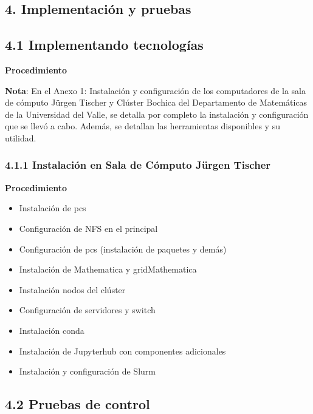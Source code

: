 \begin{spacing}{1.5}
  \begin{tightcenter}
    \section{4. Implementación y pruebas}
    \mylinespacing
  \end{tightcenter}

  \subsection{4.1 Implementando tecnologías}

  \textbf{Procedimiento}

  \textbf{Nota}: En el Anexo 1: Instalación y configuración de los computadores de la sala de cómputo Jürgen Tischer y Clúster Bochica del Departamento de Matemáticas de la Universidad del Valle, se detalla por completo la instalación y configuración que se llevó a cabo. Además, se detallan las herramientas disponibles y su utilidad.

  \subsubsection{4.1.1 Instalación en Sala de Cómputo Jürgen Tischer}

  \textbf{Procedimiento}

  \begin{itemize}
      \item Instalación de pcs
      \item Configuración de NFS en el principal
      \item Configuración de pcs (instalación de paquetes y demás)
      \item Instalación de Mathematica y gridMathematica
      \item Instalación nodos del clúster
      \item Configuración de servidores y switch
      \item Instalación conda
      \item Instalación de Jupyterhub con componentes adicionales
      \item Instalación y configuración de Slurm

  \end{itemize}

  \subsection{4.2 Pruebas de control}


\end{spacing}
